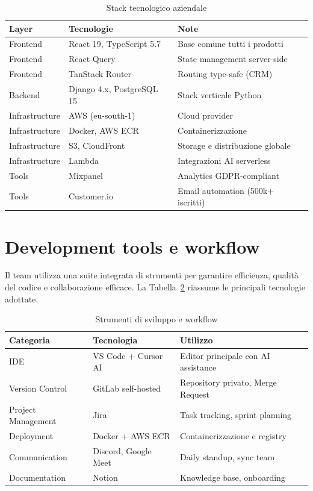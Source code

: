 \begin{table}[h]
\centering
\caption{Stack tecnologico aziendale}
\label{tab:stack-aziendale}
\begin{tabular}{|l|l|p{6.5cm}|}
\hline
\textbf{Layer} & \textbf{Tecnologie} & \textbf{Note} \\
\hline
Frontend & React 19, TypeScript 5.7 & Base comune tutti i prodotti \\
\hline
Frontend & React Query & State management server-side \\
\hline
Frontend & TanStack Router & Routing type-safe (CRM) \\
\hline
Backend & Django 4.x, PostgreSQL 15 & Stack verticale Python \\
\hline
Infrastructure & AWS (eu-south-1) & Cloud provider \\
\hline
Infrastructure & Docker, AWS ECR & Containerizzazione \\
\hline
Infrastructure & S3, CloudFront & Storage e distribuzione globale \\
\hline
Infrastructure & Lambda & Integrazioni AI serverless \\
\hline
Tools & Mixpanel & Analytics GDPR-compliant \\
\hline
Tools & Customer.io & Email automation (500k+ iscritti) \\
\hline
\end{tabular}
\end{table}

\section{Development tools e workflow}

Il team utilizza una suite integrata di strumenti per garantire efficienza, 
qualità del codice e collaborazione efficace. La Tabella~\ref{tab:dev-tools} 
riassume le principali tecnologie adottate.

\clearpage
\begin{table}[h]
\centering
\caption{Strumenti di sviluppo e workflow}
\label{tab:dev-tools}
\begin{tabular}{|l|l|p{6cm}|}
\hline
\textbf{Categoria} & \textbf{Tecnologia} & \textbf{Utilizzo} \\
\hline
IDE & VS Code + Cursor AI & Editor principale con AI assistance \\
\hline
Version Control & GitLab self-hosted & Repository privato, Merge Request \\
\hline
Project Management & Jira & Task tracking, sprint planning \\
\hline
Deployment & Docker + AWS ECR & Containerizzazione e registry \\
\hline
Communication & Discord, Google Meet & Daily standup, sync team \\
\hline
Documentation & Notion & Knowledge base, onboarding \\
\hline
\end{tabular}
\end{table}

